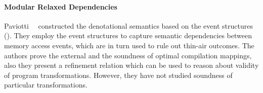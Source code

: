 \paragraph{Modular Relaxed Dependencies}

Paviotti~\etal~\cite{Paviotti-al:ESOP20} constructed the 
denotational semantics based on the event structures (\MRD). 
They employ the event structures to capture 
semantic dependencies between memory access events, 
which are in turn used to rule out thin-air outcomes.
The authors prove the external \DRF and 
the soundness of optimal compilation mappings,
also they present a refinement relation which 
can be used to reason about validity of program transformations. 
However, they have not studied soundness of particular transformations. 
